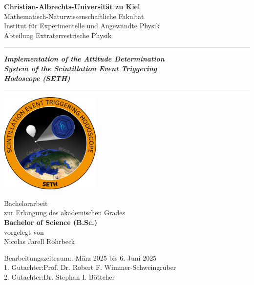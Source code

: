 \begin{titlepage}
\Huge\centering

\textbf{Christian-Albrechts-Universität zu Kiel}\\\LARGE\vspace{0.6cm}
Mathematisch-Naturwissenschaftliche Fakultät\\
\Large\vspace{0.2cm}
Institut für Experimentelle und Angewandte Physik\\\vspace{0.1cm}
Abteilung Extraterrestrische Physik\\\LARGE\vspace{2cm}

\hrule
\textbf{\textit{Implementation of the Attitude Determination\\ System of the Scintillation Event Triggering\\ Hodoscope (SETH)}}
\vspace{0.3cm}
\hrule
\vspace{1cm}

\includegraphics[height=5cm]{images/logo_Seth.png}

\vspace{0.9cm}

\LARGE
Bachelorarbeit\\\vspace{0.2cm}\Large
zur Erlangung des akademischen Grades\\\vspace{0.2cm}\LARGE
\textbf{Bachelor of Science (B.Sc.)}\\
\large\vspace{1cm}
vorgelegt von\\\vspace{0.2cm}\Large
Nicolas Jarell Rohrbeck

\vspace{1.1cm}
\normalsize
\begin{flushleft}
Bearbeitungszeitraum:. März 2025 bis 6. Juni 2025\\
1. Gutachter:\quad Prof. Dr. Robert F. Wimmer-Schweingruber\\
2. Gutachter:\quad Dr. Stephan I. Böttcher\\
\end{flushleft}

\end{titlepage}
\restoregeometry